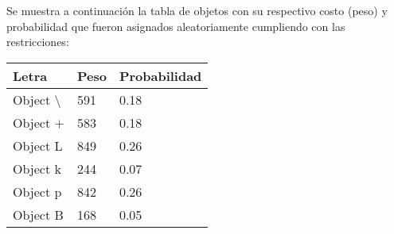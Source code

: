 \documentclass[10pt,letterpaper]{article}
\begin{document}
Se muestra a continuación la tabla de objetos con su respectivo costo (peso) y probabilidad 
        que fueron asignados aleatoriamente cumpliendo con las restricciones: 
\begin{center}
\begin{tabu} to 0.6\textwidth { | X[l] | X[l] | X[l] | } 
\hline
{}
\textbf{Letra} & \textbf{Peso} & \textbf{Probabilidad}\\
\hline
Object \textbackslash & 591 & 0.18 \\
\hline
Object $+$ & 583 & 0.18 \\
\hline
Object L & 849 & 0.26 \\
\hline
Object k & 244 & 0.07 \\
\hline
Object p & 842 & 0.26 \\
\hline
Object B & 168 & 0.05 \\
\hline
\end{tabu} \\
\end{center}
\end{document}
